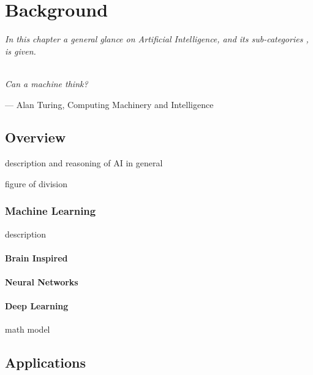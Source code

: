 \chapter{Background}
\textit{In this chapter a general glance on Artificial Intelligence, and its sub-categories , is given.}\\\\


\epigraph{ \textit{Can a machine think?}}{--- \textup{Alan Turing}, Computing Machinery and Intelligence}

\section{Overview}

description and reasoning of AI in general 

figure of division 

\subsection{Machine Learning}
 description 
 
 \subsubsection{Brain Inspired}
 
\subsubsection{Neural Networks}

\subsubsection{Deep Learning}

 math model 
 
 
\section{Applications}

